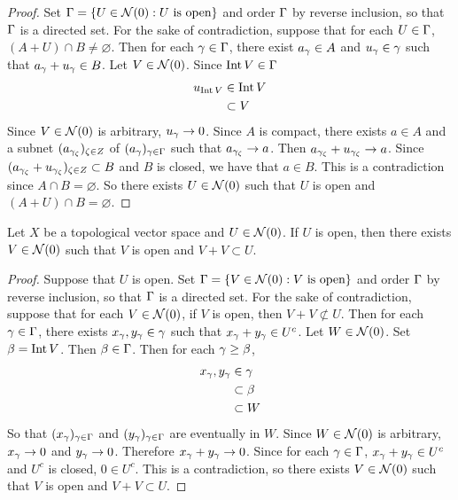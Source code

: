 \documentclass{book}
\begin{document}
	\begin{proof}
		Set $\Gamma = \{U \in \mathcal{N}(0): U \text{ is open}\}$ and order $\Gamma$ by reverse inclusion, so that $\Gamma$ is a directed set. For the sake of contradiction, suppose that for each $U \in \Gamma$, $(A + U) \cap B \neq \varnothing$. Then for each $\gamma \in \Gamma$, there exist $a_{\gamma} \in A$ and $u_{\gamma} \in \gamma$ such that $a_{\gamma} + u_{\gamma} \in B$. Let $V \in \mathcal{N}(0)$. Since $\operatorname{Int} V \in \Gamma$
		\begin{align*}
			u_{\operatorname{Int} V} 
			& \in \operatorname{Int} V \\
			& \subset V
		\end{align*}
		Since $V \in \mathcal{N}(0)$ is arbitrary, $u_{\gamma} \rightarrow 0$.  Since $A$ is compact, there exists $a \in A$ and a subnet $(a_{\gamma_{\zeta}})_{\zeta \in Z}$ of $(a_{\gamma})_{\gamma \in \Gamma}$ such that $a_{\gamma_{\zeta}} \rightarrow a$. Then $a_{\gamma_{\zeta}} + u_{\gamma_{\zeta}} \rightarrow a$. Since $(a_{\gamma_{\zeta}} + u_{\gamma_{\zeta}})_{\zeta \in Z} \subset B$ and $B$ is closed, we have that $a \in B$. This is a contradiction since $A \cap B = \varnothing$. So there exists $U \in \mathcal{N}(0)$ such that $U$ is open and $(A+U) \cap B = \varnothing$.
	\end{proof}

	\begin{ex}
		Let $X$ be a topological vector space and $U \in \mathcal{N}(0)$. If $U$ is open, then there exists $V \in \mathcal{N}(0)$ such that $V$ is open and $V+V \subset U$.
	\end{ex}

	\begin{proof}
		Suppose that $U$ is open. Set $\Gamma = \{V \in \mathcal{N}(0): V \text{ is open}\}$ and order $\Gamma$ by reverse inclusion, so that $\Gamma$ is a directed set. For the sake of contradiction, suppose that for each $V \in \mathcal{N}(0)$, if $V$ is open, then $V + V \not \subset U$. Then for each $\gamma \in \Gamma$, there exists $x_{\gamma}, y_{\gamma} \in \gamma$ such that $x_{\gamma}+y_{\gamma} \in U^c$. Let $W \in \mathcal{N}(0)$. Set $\beta = \operatorname{Int} V$. Then $\beta \in \Gamma$. Then for each $\gamma \geq \beta$, 
		\begin{align*}
			x_{\gamma},y_{\gamma} 
			& \in \gamma \\
			& \subset \beta \\
			& \subset W
		\end{align*}
		So that $(x_{\gamma})_{\gamma \in \Gamma}$ and $(y_{\gamma})_{\gamma \in \Gamma}$ are eventually in $W$. Since $W \in \mathcal{N}(0)$ is arbitrary, $x_{\gamma} \rightarrow 0$ and	$y_{\gamma} \rightarrow 0$. Therefore $x_{\gamma} + y_{\gamma} \rightarrow 0$. Since for each $\gamma \in \Gamma$, $x_{\gamma} + y_{\gamma} \in U^c$ and $U^c$ is closed, $0 \in U^c$. This is a contradiction, so there exists $V \in \mathcal{N}(0)$ such that $V$ is open and $V+V \subset U$.
		\end{proof}
\end{document}
